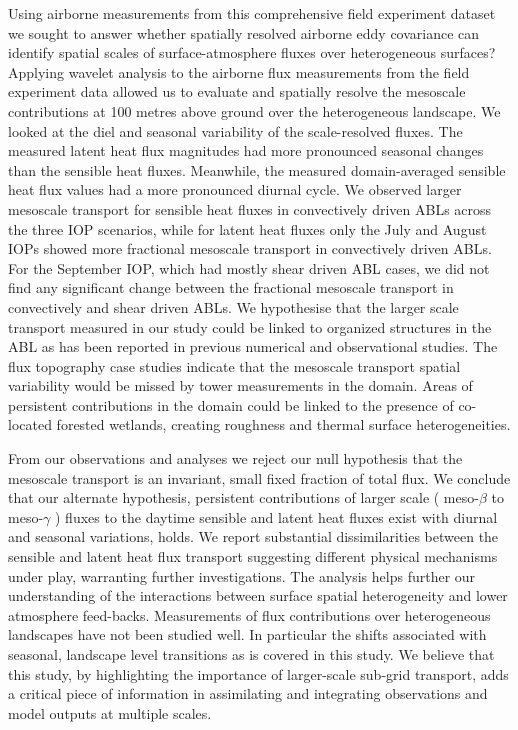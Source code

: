 \documentclass[draft]{agujournal2019}
\begin{document}
Using airborne measurements from this comprehensive field experiment dataset we sought to answer whether spatially resolved airborne eddy covariance can identify spatial scales of surface-atmosphere fluxes over heterogeneous surfaces?  Applying wavelet analysis to the airborne flux measurements from the field experiment data allowed us to evaluate and spatially resolve the mesoscale contributions at 100 metres above ground over the heterogeneous landscape. We looked at the diel and seasonal variability of the scale-resolved fluxes. The measured latent heat flux magnitudes had more pronounced seasonal changes than the sensible heat fluxes. Meanwhile, the measured domain-averaged sensible heat flux values had a more pronounced diurnal cycle. We observed larger mesoscale transport for sensible heat fluxes in convectively driven ABLs across the three IOP scenarios, while for latent heat fluxes only the July and August IOPs showed more fractional mesoscale transport in convectively driven ABLs. For the September IOP, which had mostly shear driven ABL cases, we did not find any significant change between the fractional mesoscale transport in convectively and shear driven ABLs. We hypothesise that the larger scale transport measured in our study could be linked to organized structures in the ABL as has been reported in previous numerical \cite{kanda_les_2004, inagaki_impact_2006, salesky_coherent_2020, margairaz_surface_2020} and observational \cite{eder_mesoscale_2015, morrison_impact_2021} studies. The flux topography case studies indicate that the mesoscale transport spatial variability would be missed by tower measurements in the domain. Areas of persistent contributions in the domain could be linked to the presence of co-located forested wetlands, creating roughness and thermal surface heterogeneities. 

From our observations and analyses we reject our null hypothesis that the mesoscale transport is an invariant, small fixed fraction of total flux. We conclude that our alternate hypothesis, persistent contributions of larger scale ( meso-$\beta$ to meso-$\gamma$ ) fluxes to the daytime sensible and latent heat fluxes exist with diurnal and seasonal variations, holds. We report substantial dissimilarities between the sensible and latent heat flux transport suggesting different physical mechanisms under play, warranting further investigations. The analysis helps further our understanding of the interactions between surface spatial heterogeneity and lower atmosphere feed-backs. Measurements of flux contributions over heterogeneous landscapes have not been studied well. In particular the shifts associated with seasonal, landscape level transitions as is covered in this study. We believe that this study, by highlighting the importance of larger-scale sub-grid transport,  adds a critical piece of information in assimilating and integrating observations and model outputs at multiple scales.
\end{document}
